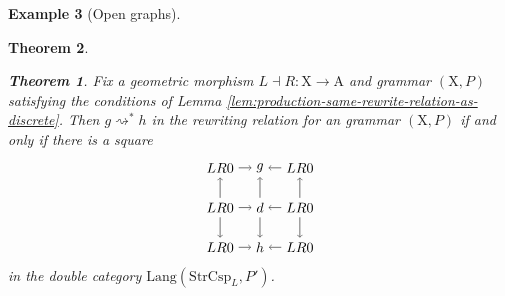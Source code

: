 \documentclass{amsart}
\newcommand{\A}{\cat{A}}
\newcommand{\X}{\cat{X}}
\newcommand{\StrCsp}{\cat{StrCsp}}
\newcommand{\Lang}{\mathrm{Lang}}
\newcommand{\cat}[1]{\mathrm{#1}}
\newcommand{\from}{\colon}
\newcommand{\deriv}[2]{#1 \rightsquigarrow^\ast #2}
\newtheorem{theorem}{Theorem}[section]
\theoremstyle{remark}
\theoremstyle{definition}
\newtheorem{example}[theorem]{Example}
\begin{document}
\begin{example}[Open graphs]
{{\begin{theorem}
\begin{theorem} \label{thm:inductive-rewriting}
  Fix a geometric morphism $ L \dashv R \from \X \to \A $ and grammar
  $ ( \X , P ) $ satisfying the conditions of Lemma
  \ref{lem:production-same-rewrite-relation-as-discrete}. Then
  $ \deriv{g}{h} $ in the rewriting relation for an grammar
  $ ( \X , P ) $ if and only if there is a square
  \[
    \begin{tikzpicture}
      \node (1t) at (0,2) {$ LR 0 $};
      \node (2t) at (1,2) {$ g $};
      \node (3t) at (2,2) {$ LR 0 $};
      \node (1m) at (0,1) {$ LR 0 $};
      \node (2m) at (1,1) {$ d $};
      \node (3m) at (2,1) {$ LR 0 $};
      \node (1b) at (0,0) {$ LR 0 $};
      \node (2b) at (1,0) {$ h $};
      \node (3b) at (2,0) {$ LR 0 $};
      \draw [->] (1t) to node [] {\scriptsize{$  $}} (2t);
      \draw [->] (3t) to node [] {\scriptsize{$  $}} (2t);
      \draw [->] (1m) to node [] {\scriptsize{$  $}} (2m);
      \draw [->] (3m) to node [] {\scriptsize{$  $}} (2m);
      \draw [->] (1b) to node [] {\scriptsize{$  $}} (2b);
      \draw [->] (3b) to node [] {\scriptsize{$  $}} (2b);
      \draw [->] (1m) to node [] {\scriptsize{$  $}} (1t);
      \draw [->] (1m) to node [] {\scriptsize{$  $}} (1b);
      \draw [->] (2m) to node [] {\scriptsize{$  $}} (2t);
      \draw [->] (2m) to node [] {\scriptsize{$  $}} (2b);
      \draw [->] (3m) to node [] {\scriptsize{$  $}} (3t);
      \draw [->] (3m) to node [] {\scriptsize{$  $}} (3b);
    \end{tikzpicture}
  \]
  in the double category $ \Lang ( \StrCsp_L , P' ) $.
\end{theorem}


\end{theorem}}}
\end{example}
\end{document}

